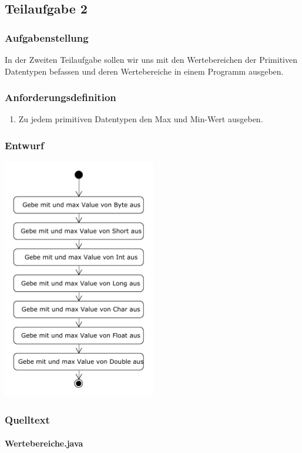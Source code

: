 \subsection{Teilaufgabe 2}
\subsubsection{Aufgabenstellung}
In der Zweiten Teilaufgabe sollen wir uns mit den Wertebereichen der Primitiven Datentypen befassen und
deren Wertebereiche in einem Programm ausgeben.

\subsubsection{Anforderungsdefinition}
\begin{enumerate}
	\item Zu jedem primitiven Datentypen den Max und Min-Wert ausgeben.
\end{enumerate}

\subsubsection{Entwurf}
\begin{center}
	\includegraphics[width=0.5\textwidth]{uml/uml_c3_p2.pdf}
\end{center}

\subsubsection{Quelltext}
\paragraph{Wertebereiche.java}\




